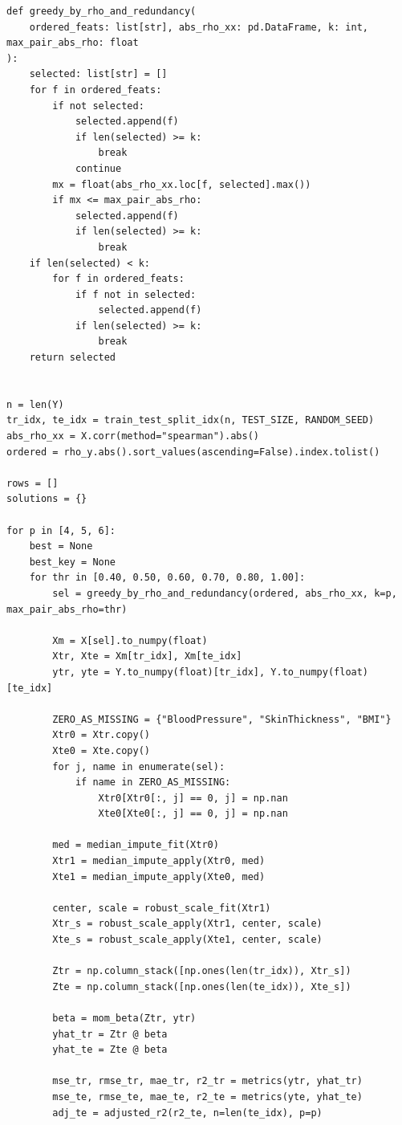 \documentclass[a4paper, 14pt]{extarticle}
\begin{document}
\begin{longlisting}
\begin{verbatim}
def greedy_by_rho_and_redundancy(
    ordered_feats: list[str], abs_rho_xx: pd.DataFrame, k: int, max_pair_abs_rho: float
):
    selected: list[str] = []
    for f in ordered_feats:
        if not selected:
            selected.append(f)
            if len(selected) >= k:
                break
            continue
        mx = float(abs_rho_xx.loc[f, selected].max())
        if mx <= max_pair_abs_rho:
            selected.append(f)
            if len(selected) >= k:
                break
    if len(selected) < k:
        for f in ordered_feats:
            if f not in selected:
                selected.append(f)
            if len(selected) >= k:
                break
    return selected


n = len(Y)
tr_idx, te_idx = train_test_split_idx(n, TEST_SIZE, RANDOM_SEED)
abs_rho_xx = X.corr(method="spearman").abs()
ordered = rho_y.abs().sort_values(ascending=False).index.tolist()

rows = []
solutions = {}

for p in [4, 5, 6]:
    best = None
    best_key = None
    for thr in [0.40, 0.50, 0.60, 0.70, 0.80, 1.00]:
        sel = greedy_by_rho_and_redundancy(ordered, abs_rho_xx, k=p, max_pair_abs_rho=thr)

        Xm = X[sel].to_numpy(float)
        Xtr, Xte = Xm[tr_idx], Xm[te_idx]
        ytr, yte = Y.to_numpy(float)[tr_idx], Y.to_numpy(float)[te_idx]

        ZERO_AS_MISSING = {"BloodPressure", "SkinThickness", "BMI"}
        Xtr0 = Xtr.copy()
        Xte0 = Xte.copy()
        for j, name in enumerate(sel):
            if name in ZERO_AS_MISSING:
                Xtr0[Xtr0[:, j] == 0, j] = np.nan
                Xte0[Xte0[:, j] == 0, j] = np.nan

        med = median_impute_fit(Xtr0)
        Xtr1 = median_impute_apply(Xtr0, med)
        Xte1 = median_impute_apply(Xte0, med)
        
        center, scale = robust_scale_fit(Xtr1)
        Xtr_s = robust_scale_apply(Xtr1, center, scale)
        Xte_s = robust_scale_apply(Xte1, center, scale)

        Ztr = np.column_stack([np.ones(len(tr_idx)), Xtr_s])
        Zte = np.column_stack([np.ones(len(te_idx)), Xte_s])

        beta = mom_beta(Ztr, ytr)
        yhat_tr = Ztr @ beta
        yhat_te = Zte @ beta

        mse_tr, rmse_tr, mae_tr, r2_tr = metrics(ytr, yhat_tr)
        mse_te, rmse_te, mae_te, r2_te = metrics(yte, yhat_te)
        adj_te = adjusted_r2(r2_te, n=len(te_idx), p=p)
    

\end{verbatim}
\end{longlisting}
\end{document}
